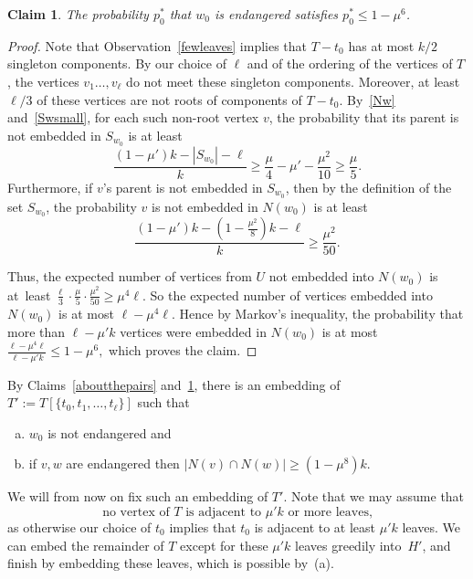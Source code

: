 \documentclass[12pt]{article}
\newtheorem{claim}[theorem]{Claim}
\begin{document}
\begin{claim}\label{w0notendangered} 
    The probability $p^*_0$ that $w_0$ is endangered satisfies $p^*_0\le 1-\mu^6$.
\end{claim}
\begin{proof}
    Note that Observation~\ref{fewleaves} implies that  $T-t_0$ has at most ${k}/{2}$ singleton components.  By our choice of $\ell$ and of the ordering of the vertices of $T$, the vertices $v_1\ldots, v_{\ell}$ do not meet these singleton components. Moreover, at least $\ell/3$ of these vertices are not roots
of components of $T-t_0$. 
  By~\eqref{Nw} and~\eqref{Swsmall}, for each such non-root vertex $v$, the probability that its parent
is not embedded in $S_{w_0}$ is at least
    $$\frac{(1-\mu' )k-|S_{w_0}|-\ell}k
    \ge \frac \mu 4-\mu'-\frac{\mu^2}{10}
    \ge \frac\mu 5.$$ 
    Furthermore, if $v$'s parent is not embedded in $S_{w_0}$, then by the definition of the set  $S_{w_0}$,  the probability $v$ is not embedded in $N(w_0)$ is at least $$\frac{(1-\mu')k-(1-\frac{\mu^2}8)k-\ell}k\ge  \frac{\mu^2}{50}.$$
    
     Thus, the expected number of vertices from $U$  not embedded into $N(w_0)$ is at~least $\frac{\ell}{3}\cdot\frac{\mu}{5}\cdot\frac{\mu^2}{50}
\ge \mu^4\ell$. So the expected number of vertices  embedded into $N(w_0)$ is at most $\ell-\mu^4\ell$. 
Hence by Markov's inequality, the probability that more than $\ell - \mu' k$ vertices were embedded in  $N(w_0)$ is at most 
$\frac{\ell-\mu^4\ell}{\ell - \mu' k}\le 1-\mu^6,$
which proves the claim.
\end{proof}

     
      
      By Claims~\ref{aboutthepairs} and~\ref{w0notendangered}, there is an embedding of $T':=T[\{t_0,t_1,\ldots, t_{\ell}\}]$  such that
      \begin{enumerate}[(a)]
      \item $w_0$ is not endangered and
      \item\label{b}  if $v,w$ are endangered then $|N(v) \cap N(w)| \ge (1-\mu^8)k$. 
       \end{enumerate}
      We will from now on fix such an embedding of $T'$.
      Note that we may assume that
\begin{equation}\label{nomukleaves}
\text{no vertex of $T$   is adjacent to $\mu' k$ or more leaves,}
\end{equation}
as otherwise our choice of $t_0$ implies that 
$t_0$ is adjacent to at least $\mu' k$ leaves. We
  can embed the remainder of  $T$ except for these $\mu' k$ leaves greedily into~$H'$, and finish by embedding these leaves, which is possible by~(a).
\end{document}
